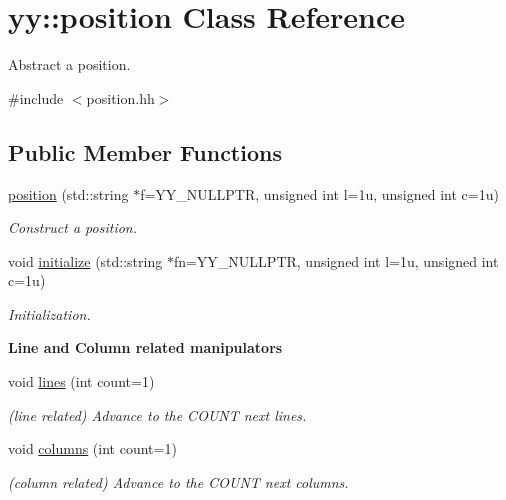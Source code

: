 \hypertarget{classyy_1_1position}{}\section{yy\+:\+:position Class Reference}
\label{classyy_1_1position}


Abstract a position.  




{\ttfamily \#include $<$position.\+hh$>$}

\subsection*{Public Member Functions}
\begin{DoxyCompactItemize}
\item 
\mbox{\label{classyy_1_1position_ad3fcd2dd0259a48f24451f7a2dc620c8}} 
\hyperlink{classyy_1_1position_ad3fcd2dd0259a48f24451f7a2dc620c8}{position} (std\+::string $\ast$f=Y\+Y\+\_\+\+N\+U\+L\+L\+P\+TR, unsigned int l=1u, unsigned int c=1u)
\begin{DoxyCompactList}\small\item\em Construct a position. \end{DoxyCompactList}\item 
\mbox{\label{classyy_1_1position_ab00c8d19ee14c5ed6a2fc344f4b6e6a1}} 
void \hyperlink{classyy_1_1position_ab00c8d19ee14c5ed6a2fc344f4b6e6a1}{initialize} (std\+::string $\ast$fn=Y\+Y\+\_\+\+N\+U\+L\+L\+P\+TR, unsigned int l=1u, unsigned int c=1u)
\begin{DoxyCompactList}\small\item\em Initialization. \end{DoxyCompactList}\end{DoxyCompactItemize}
\begin{Indent}\textbf{ Line and Column related manipulators}\par
\begin{DoxyCompactItemize}
\item 
\mbox{\label{classyy_1_1position_a4fbdd03b4e09fa8755d79d3e675d6d3a}} 
void \hyperlink{classyy_1_1position_a4fbdd03b4e09fa8755d79d3e675d6d3a}{lines} (int count=1)
\begin{DoxyCompactList}\small\item\em (line related) Advance to the C\+O\+U\+NT next lines. \end{DoxyCompactList}\item 
\mbox{\label{classyy_1_1position_ab15e0388c4fd433aa19c2435e49f72e9}} 
void \hyperlink{classyy_1_1position_ab15e0388c4fd433aa19c2435e49f72e9}{columns} (int count=1)
\begin{DoxyCompactList}\small\item\em (column related) Advance to the C\+O\+U\+NT next columns. \end{DoxyCompactList}\end{DoxyCompactItemize}
\end{Indent}
